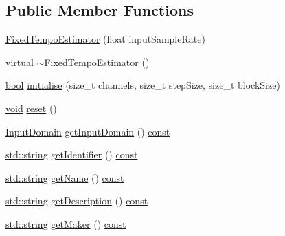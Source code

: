 \subsection*{Public Member Functions}
\begin{DoxyCompactItemize}
\item 
\hyperlink{class_fixed_tempo_estimator_a3967c189f054f864639837c2519bd64d}{Fixed\+Tempo\+Estimator} (float input\+Sample\+Rate)
\item 
virtual \hyperlink{class_fixed_tempo_estimator_a0302c4bfdc163a3d34478cde93c96a53}{$\sim$\+Fixed\+Tempo\+Estimator} ()
\item 
\hyperlink{mac_2config_2i386_2lib-src_2libsoxr_2soxr-config_8h_abb452686968e48b67397da5f97445f5b}{bool} \hyperlink{class_fixed_tempo_estimator_aa7500a4ffbc4653baaf5101defdb37f5}{initialise} (size\+\_\+t channels, size\+\_\+t step\+Size, size\+\_\+t block\+Size)
\item 
\hyperlink{sound_8c_ae35f5844602719cf66324f4de2a658b3}{void} \hyperlink{class_fixed_tempo_estimator_ac41708397255400c6682fee6c1b3d45f}{reset} ()
\item 
\hyperlink{class_vamp_1_1_plugin_a39cb7649d6dcc20e4cb1640cd55907bc}{Input\+Domain} \hyperlink{class_fixed_tempo_estimator_a055689c9b41b0945e8d3cdbc3b8c3a2e}{get\+Input\+Domain} () \hyperlink{getopt1_8c_a2c212835823e3c54a8ab6d95c652660e}{const} 
\item 
\hyperlink{test__lib_f_l_a_c_2format_8c_ab02026ad0de9fb6c1b4233deb0a00c75}{std\+::string} \hyperlink{class_fixed_tempo_estimator_ab818edcf1555177d10260e197e3a5e7a}{get\+Identifier} () \hyperlink{getopt1_8c_a2c212835823e3c54a8ab6d95c652660e}{const} 
\item 
\hyperlink{test__lib_f_l_a_c_2format_8c_ab02026ad0de9fb6c1b4233deb0a00c75}{std\+::string} \hyperlink{class_fixed_tempo_estimator_af9eb6fa8a98aa66b55e64e1795f9405f}{get\+Name} () \hyperlink{getopt1_8c_a2c212835823e3c54a8ab6d95c652660e}{const} 
\item 
\hyperlink{test__lib_f_l_a_c_2format_8c_ab02026ad0de9fb6c1b4233deb0a00c75}{std\+::string} \hyperlink{class_fixed_tempo_estimator_a06b00853f00c2e78d490697fcd7d1920}{get\+Description} () \hyperlink{getopt1_8c_a2c212835823e3c54a8ab6d95c652660e}{const} 
\item 
\hyperlink{test__lib_f_l_a_c_2format_8c_ab02026ad0de9fb6c1b4233deb0a00c75}{std\+::string} \hyperlink{class_fixed_tempo_estimator_ae910d1b9250b11097fd6b51cd8285b68}{get\+Maker} () \hyperlink{getopt1_8c_a2c212835823e3c54a8ab6d95c652660e}{const} 
\item 

\end{DoxyCompactItemize}

